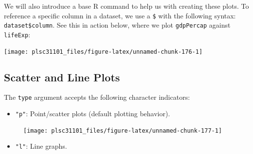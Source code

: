 \documentclass[]{book}
\newenvironment{Shaded}{\begin{snugshade}}{\end{snugshade}}
\newcommand{\KeywordTok}[1]{\textcolor[rgb]{0.13,0.29,0.53}{\textbf{#1}}}
\newcommand{\DataTypeTok}[1]{\textcolor[rgb]{0.13,0.29,0.53}{#1}}
\newcommand{\StringTok}[1]{\textcolor[rgb]{0.31,0.60,0.02}{#1}}
\newcommand{\OperatorTok}[1]{\textcolor[rgb]{0.81,0.36,0.00}{\textbf{#1}}}
\newcommand{\NormalTok}[1]{#1}
\providecommand{\tightlist}{%
  \setlength{\itemsep}{0pt}\setlength{\parskip}{0pt}}
\begin{document}
We will also introduce a base R command to help us with creating these
plots. To reference a specific column in a dataset, we use a \texttt{\$}
with the following syntax: \texttt{dataset\$column}. See this in action
below, where we plot \texttt{gdpPercap} against \texttt{lifeExp}:

\begin{Shaded}
\end{Shaded}

\begin{center}\texttt{[image: plsc31101\_files/figure-latex/unnamed-chunk-176-1]} \end{center}

\subsection{Scatter and Line Plots}\label{scatter-and-line-plots}

The \texttt{type} argument accepts the following character indicators:

\begin{itemize}
\tightlist
\item
  \texttt{"p"}: Point/scatter plots (default plotting behavior).
\end{itemize}

\begin{Shaded}
\end{Shaded}

\begin{figure}

{\centering \texttt{[image: plsc31101\_files/figure-latex/unnamed-chunk-177-1]} 

}

\caption{ }\label{fig:unnamed-chunk-177}
\end{figure}

\begin{itemize}
\tightlist
\item
  \texttt{"l"}: Line graphs.
\end{itemize}
\end{document}
